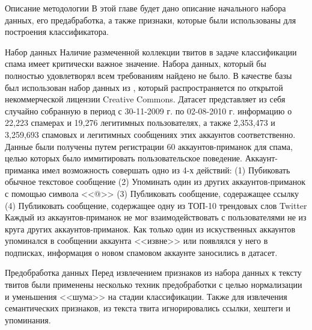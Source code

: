 \begin{section}{Описание методологии}
   В этой главе будет дано описание начального набора данных,
   его предабработка, а также признаки, которые были использованы для построения классификатора.
  \begin{subsection}{Набор данных}
    \label{sec:dataset}
    Наличие размеченной коллекции твитов в задаче классификации
    спама имеет критически важное значение.
    Набора данных, который бы полностью удовлетворял всем требованиям найдено не было.
    В качестве базы был использован набор данных из \cite{Lee}, который распространяется
    по открытой некоммерческой лицензии Creative Commons.
    Датасет представляет из себя случайно собранную в период с 30-11-2009 г. по 02-08-2010 г. информацию
    о 22,223 спамерах и 19,276 легитимных пользователях, а также 2,353,473 и 3,259,693
    спамовых и легитимных сообщениях этих аккаунтов соответственно.
    Данные были получены путем регистрации 60 аккаунтов-приманок для спама, целью которых
    было иммитировать пользовательское поведение.
    Аккаунт-приманка имел возможность совершать одно из 4-х действий: (1) Пубиковать обычное текстовое сообщение (2) Упоминать один из других аккаунтов-приманок с помощью символа <<@>>  (3) Публиковать сообщение, содеражащее ссылку (4) Публиковать сообщение, содержащее одну из ТОП-10 трендовых слов Twitter
    Каждый из аккаунтов-приманок не мог взаимодействовать
    с пользователями не из круга других аккаунтов-приманок. Как только один из искуственных аккаунтов упоминался в сообщении аккаунта <<извне>> или появлялся у него в подписках, информация о новом спамовом аккаунте заносились в датасет.


  \end{subsection}

  \begin{subsection}{Предобработка данных}
     Перед извлечением признаков из набора данных к тексту твитов были применены несколько техник предобработки с целью нормализации и уменьшения <<шума>> на стадии классификации.
     Также для извлечения семантических признаков, из текста твита игнорировались ссылки, хештеги и упоминания.
  \end{subsection}


\end{section}
